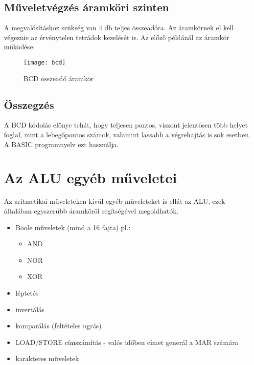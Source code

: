 \subsection{Műveletvégzés áramköri szinten}
A megvalósításhoz szükség van 4 db teljes összeadóra.
Az áramkörnek el kell végeznie az érvénytelen tetrádok kezelését is.
Az előző példánál az áramkör működése:
\begin{figure}[H]
    \texttt{[image: bcd]}
    \centering
    \caption{BCD összeadó áramkör}
    \label{fig:bcd}
\end{figure}

\subsection{Összegzés}
A BCD kódolás előnye tehát, hogy teljesen pontos, viszont jelentősen több helyet foglal, mint a lebegőpontos számok, valamint lassabb a végrehajtás is sok esetben.
A BASIC programnyelv ezt használja.

\section{Az ALU egyéb műveletei}
Az aritmetikai műveleteken kívül egyéb műveleteket is ellát az ALU, ezek általában egyszerűbb áramköröl segítségével megoldhatók.
\begin{itemize}
    \item Boole műveletek (mind a 16 fajta) pl.:
    \begin{itemize}
        \item AND
        \item NOR
        \item XOR
    \end{itemize}
    \item léptetés
    \item invertálás
    \item komparálás (feltételes ugrás)
    \item LOAD/STORE címszámítás - valós időben címet generál a MAR számára
    \item karakteres műveletek
\end{itemize}